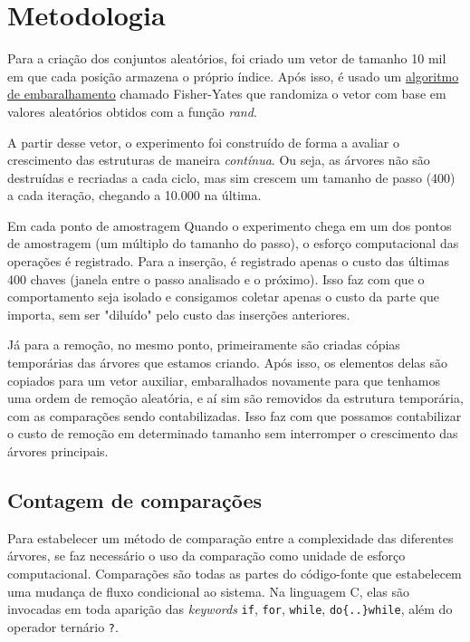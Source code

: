 \documentclass[a4paper, 12pt]{article}
\begin{document}
\newpage

\section{Metodologia}
Para a criação dos conjuntos aleatórios, foi criado um vetor de tamanho 10 mil
em que cada posição armazena o próprio índice. Após isso, é usado um
\href{https://benpfaff.org/writings/clc/shuffle.html}{algoritmo de embaralhamento}
chamado Fisher-Yates
que randomiza o vetor com base em valores aleatórios obtidos com a função \textit{rand}.

A partir desse vetor, o experimento foi construído de forma a avaliar o crescimento
das estruturas de maneira \textit{contínua}. Ou seja, as árvores não são destruídas
e recriadas a cada ciclo, mas sim crescem um tamanho de passo (400) a cada iteração,
chegando a 10.000 na última.


Em cada ponto de amostragem
Quando o experimento chega em um dos pontos de amostragem (um múltiplo do tamanho do passo), o
esforço computacional das operações é registrado. Para a inserção, é registrado apenas
o custo das últimas 400 chaves (janela entre o passo analisado e o próximo).
Isso faz com que o comportamento seja isolado e consigamos
coletar apenas o custo da parte que importa, sem ser "diluído" pelo custo das inserções
anteriores.

Já para a remoção, no mesmo ponto, primeiramente são criadas cópias temporárias das
árvores que estamos criando. Após isso, os elementos delas são copiados para um vetor
auxiliar, embaralhados novamente para que tenhamos uma ordem de remoção aleatória, e
aí sim são removidos da estrutura temporária, com as comparações sendo contabilizadas.
Isso faz com que possamos contabilizar o custo de remoção em determinado tamanho sem
interromper o crescimento das árvores principais.

\subsection{Contagem de comparações}
Para estabelecer um método de comparação entre a complexidade das diferentes árvores,
se faz necessário o uso da comparação como unidade de esforço computacional.
Comparações são todas as partes do código-fonte que estabelecem uma mudança de fluxo
condicional ao sistema. Na linguagem C, elas são invocadas em toda aparição das
\textit{keywords} \verb|if|, \verb|for|, \verb|while|, \verb|do{..}while|,
além do operador ternário \verb|?|.
\end{document}
